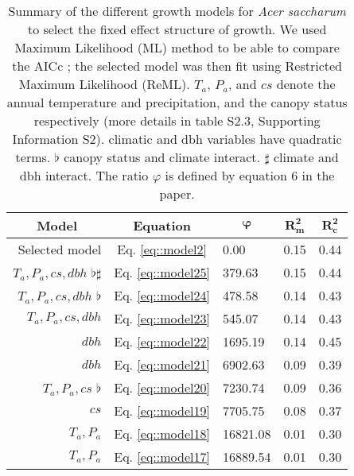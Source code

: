 \documentclass[letterpaper, 12pt]{article}
\theoremstyle{theo}
\begin{document}
\begin{refsection}
\begin{onehalfspace}
\begin{table}
	\centering
	\caption{Summary of the different growth models for \textit{Acer saccharum} to select the fixed effect structure of growth. We used Maximum Likelihood (ML) method to be able to compare the AICc \citep{AICcmodavg}; the selected model was then fit using Restricted Maximum Likelihood (ReML). $ T_a $, $ P_a $, and $ cs $ denote the annual temperature and precipitation, and the canopy status respectively (more details in table S2.3, Supporting Information S2). \dag climatic and dbh variables have quadratic terms. $ \flat $ canopy status and climate interact. $ \sharp $ climate and dbh interact. The ratio $ \varphi $ is defined by equation 6 in the paper. \label{tab::acsa_fixeff}}
	\begin{tabular}{@{}rclll@{}}
	\toprule
	\multicolumn{1}{c}{\textbf{Model}} & \multicolumn{1}{c}{\textbf{Equation}} & \multicolumn{1}{c}{$ \bm{\varphi} $} & \multicolumn{1}{c}{$ \bm{R^2_m} $} & \multicolumn{1}{c}{$ \bm{R^2_c} $} \\
	\midrule
		Selected model & Eq. \ref{eq::model2} & 0.00 & 0.15 & 0.44 \\
		$ T_a, P_a, cs, dbh $ \dag $ \flat \sharp $ & Eq. \ref{eq::model25} & 379.63 & 0.15 & 0.44 \\
		$ T_a, P_a, cs, dbh $ \dag $ \flat $ & Eq. \ref{eq::model24} & 478.58 & 0.14 & 0.43 \\
		$ T_a, P_a, cs, dbh $ \dag & Eq. \ref{eq::model23} & 545.07 & 0.14 & 0.43 \\
		$ dbh $ \dag & Eq. \ref{eq::model22} & 1695.19 & 0.14 & 0.45 \\
		$ dbh $ & Eq. \ref{eq::model21} & 6902.63 & 0.09 & 0.39 \\
		$ T_a, P_a, cs $ \dag $ \flat $ & Eq. \ref{eq::model20} & 7230.74 & 0.09 & 0.36 \\
		$ cs $ & Eq. \ref{eq::model19} & 7705.75 & 0.08 & 0.37 \\
		$ T_a, P_a $ \dag & Eq. \ref{eq::model18} & 16821.08 & 0.01 & 0.30 \\
		$ T_a, P_a $ & Eq. \ref{eq::model17} & 16889.54 & 0.01 & 0.30 \\
   \bottomrule
	\end{tabular}
\end{table}


\end{onehalfspace}
\end{refsection}
\end{document}
